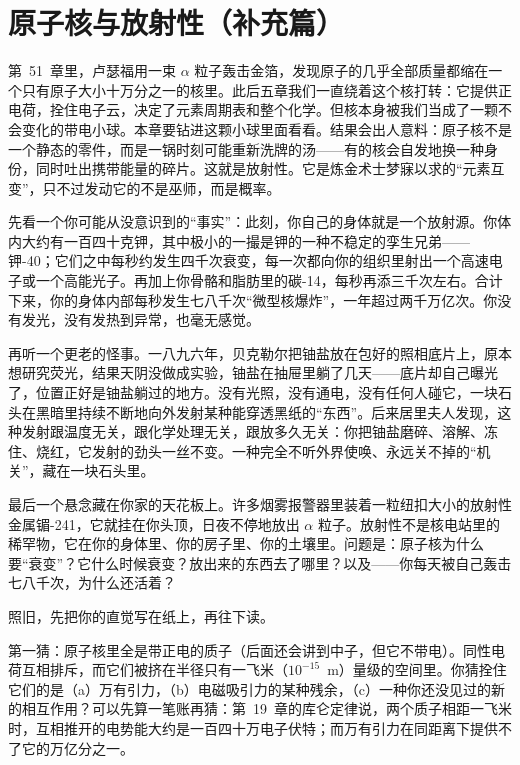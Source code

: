 \chapter{原子核与放射性（补充篇）}

第~51~章里，卢瑟福用一束 \(\alpha\) 粒子轰击金箔，发现原子的几乎全部质量都缩在一个只有原子大小十万分之一的核里。此后五章我们一直绕着这个核打转：它提供正电荷，拴住电子云，决定了元素周期表和整个化学。但核本身被我们当成了一颗不会变化的带电小球。本章要钻进这颗小球里面看看。结果会出人意料：原子核不是一个静态的零件，而是一锅时刻可能重新洗牌的汤——有的核会自发地换一种身份，同时吐出携带能量的碎片。这就是放射性。它是炼金术士梦寐以求的“元素互变”，只不过发动它的不是巫师，而是概率。


先看一个你可能从没意识到的“事实”：此刻，你自己的身体就是一个放射源。你体内大约有一百四十克钾，其中极小的一撮是钾的一种不稳定的孪生兄弟——钾-40；它们之中每秒约发生四千次衰变，每一次都向你的组织里射出一个高速电子或一个高能光子。再加上你骨骼和脂肪里的碳-14，每秒再添三千次左右。合计下来，你的身体内部每秒发生七八千次“微型核爆炸”，一年超过两千万亿次。你没有发光，没有发热到异常，也毫无感觉。

再听一个更老的怪事。一八九六年，贝克勒尔把铀盐放在包好的照相底片上，原本想研究荧光，结果天阴没做成实验，铀盐在抽屉里躺了几天——底片却自己曝光了，位置正好是铀盐躺过的地方。没有光照，没有通电，没有任何人碰它，一块石头在黑暗里持续不断地向外发射某种能穿透黑纸的“东西”。后来居里夫人发现，这种发射跟温度无关，跟化学处理无关，跟放多久无关：你把铀盐磨碎、溶解、冻住、烧红，它发射的劲头一丝不变。一种完全不听外界使唤、永远关不掉的“机关”，藏在一块石头里。

最后一个悬念藏在你家的天花板上。许多烟雾报警器里装着一粒纽扣大小的放射性金属镅-241，它就挂在你头顶，日夜不停地放出 \(\alpha\) 粒子。放射性不是核电站里的稀罕物，它在你的身体里、你的房子里、你的土壤里。问题是：原子核为什么要“衰变”？它什么时候衰变？放出来的东西去了哪里？以及——你每天被自己轰击七八千次，为什么还活着？


照旧，先把你的直觉写在纸上，再往下读。

第一猜：原子核里全是带正电的质子（后面还会讲到中子，但它不带电）。同性电荷互相排斥，而它们被挤在半径只有一飞米（\(10^{-15}\)~m）量级的空间里。你猜拴住它们的是（a）万有引力，（b）电磁吸引力的某种残余，（c）一种你还没见过的新的相互作用？可以先算一笔账再猜：第~19~章的库仑定律说，两个质子相距一飞米时，互相推开的电势能大约是一百四十万电子伏特；而万有引力在同距离下提供不了它的万亿分之一。


